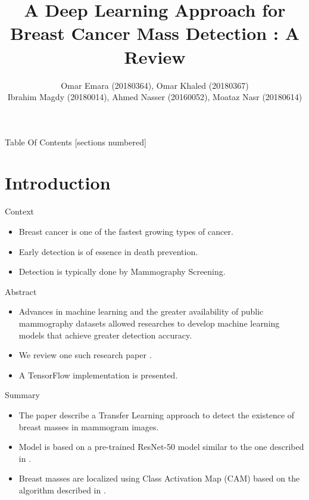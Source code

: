\documentclass{beamer}
\title{A Deep Learning Approach for Breast Cancer Mass Detection : A Review}
\author{
  Omar Emara (20180364), Omar Khaled (20180367) \\
  Ibrahim Magdy (20180014), Ahmed Nasser (20160052), Moataz Nasr (20180614)
}
\date{}
\begin{document}
\maketitle

\begin{frame}{Table Of Contents}
  [sections numbered]
  \tableofcontents[hideallsubsections]
\end{frame}

\section{Introduction}

\begin{frame}{Context}
  \begin{itemize}
    \item Breast cancer is one of the fastest growing types of cancer.
    \item Early detection is of essence in death prevention.
    \item Detection is typically done by \alert{Mammography Screening}.
  \end{itemize}
\end{frame}

\begin{frame}{Abstract}
  \begin{itemize}
    \item Advances in machine learning and the greater availability of public
      mammography datasets allowed researches to develop machine learning
      models that achieve greater detection accuracy.
    \item We review one such research paper \alert{\autocite{Fathy2019}}.
    \item A TensorFlow implementation is presented.
  \end{itemize}
\end{frame}

\begin{frame}{Summary}
  \begin{itemize}
    \item The paper describe a \alert{Transfer Learning} approach to detect the
      existence of breast masses in mammogram images.
    \item Model is based on a pre-trained \alert{ResNet-50} model similar to
      the one described in \autocite{He2016}.
    \item Breast masses are localized using \alert{Class Activation Map (CAM)}
      based on the algorithm described in \autocite{Zhou2016}.
  \end{itemize}
\end{frame}
\end{document}
